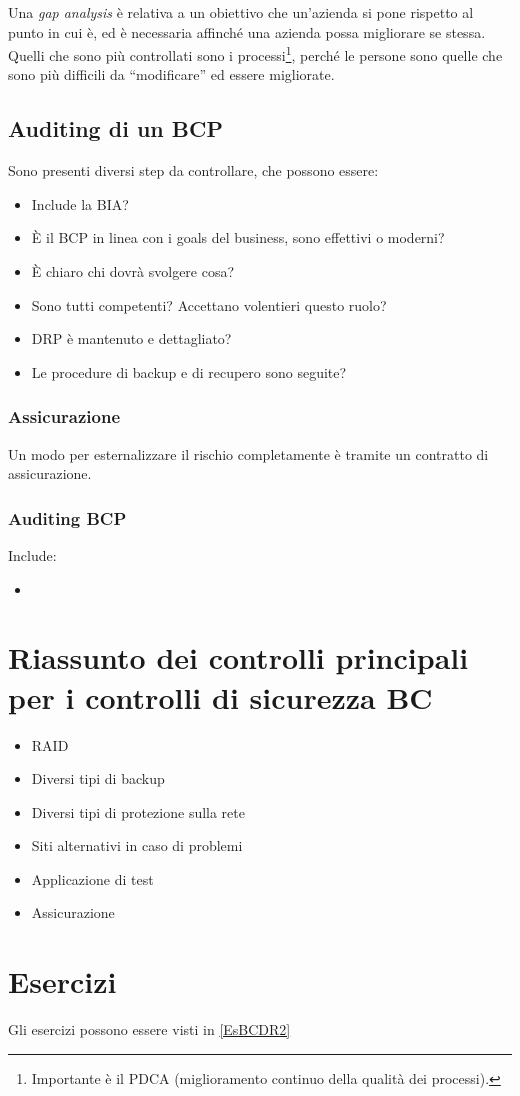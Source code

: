 Una \textit{gap analysis} è relativa a un obiettivo che un'azienda si pone 
rispetto al punto in cui è, ed è necessaria affinché una azienda possa 
migliorare se stessa. Quelli che sono più controllati sono i 
processi\footnote{Importante è il PDCA (miglioramento continuo della qualità 
dei processi).}, perché le persone sono quelle che sono più difficili da 
``modificare'' ed essere migliorate.

\subsection{Auditing di un BCP}

Sono presenti diversi step da controllare, che possono essere:
\begin{itemize}
  \item Include la BIA?
  \item È il BCP in linea con i goals del business, sono effettivi o moderni?
  \item È chiaro chi dovrà svolgere cosa?
  \item Sono tutti competenti? Accettano volentieri questo ruolo?
  \item DRP è mantenuto e dettagliato?
  \item Le procedure di backup e di recupero sono seguite?
\end{itemize}

\subsubsection{Assicurazione}

Un modo per esternalizzare il rischio completamente è tramite un contratto di assicurazione.


\subsubsection{Auditing BCP}

Include:
\begin{itemize}
\item
\end{itemize}


\section{Riassunto dei controlli principali per i controlli di sicurezza BC}

\begin{itemize}
  \item RAID
  \item Diversi tipi di backup
  \item Diversi tipi di protezione sulla rete
  \item Siti alternativi in caso di problemi
  \item Applicazione di test
  \item Assicurazione
\end{itemize}

\section{Esercizi}

Gli esercizi possono essere visti in \ref{EsBCDR2}